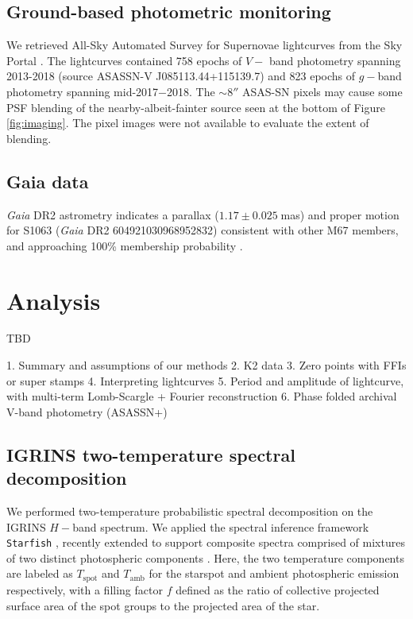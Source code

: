 \documentclass[twocolumn]{emulateapj}%
\begin{document}
\subsection{Ground-based photometric monitoring}
We retrieved All-Sky Automated Survey for Supernovae \citep[ASAS-SN;][]{shappee14} lightcurves from the Sky Portal \citep{2017PASP..129j4502K}.  The lightcurves contained 758 epochs of $V-$ band photometry spanning 2013-2018 (source ASASSN-V J085113.44+115139.7) and 823 epochs of $g-$band photometry spanning mid-2017$-$2018.  The $\sim8''$ ASAS-SN pixels may cause some PSF blending of the nearby-albeit-fainter source seen at the bottom of Figure \ref{fig:imaging}.  The pixel images were not available to evaluate the extent of blending.


\subsection{Gaia data}
\emph{Gaia} DR2 astrometry \citep{2016A&A...595A...1G, 2018A&A...616A...1G} indicates a parallax ($1.17\pm0.025 \;$mas) and proper motion for S1063 (\emph{Gaia} DR2 604921030968952832) consistent with other M67 members, and approaching 100\% membership probability \citep{2018ApJ...869....9G}.

\section{Analysis}

TBD

1. Summary and assumptions of our methods
2.  K2 data
3.  Zero points with FFIs or super stamps
4.   Interpreting lightcurves
5.  Period and amplitude of lightcurve, with multi-term Lomb-Scargle + Fourier reconstruction
6.  Phase folded archival V-band photometry (ASASSN+)


\subsection{IGRINS two-temperature spectral decomposition}

We performed two-temperature probabilistic spectral decomposition on the IGRINS $H-$band spectrum.  We applied the spectral inference framework \texttt{Starfish} \citep{czekala15}, recently extended to support composite spectra comprised of mixtures of two distinct photospheric components \citep{gullysantiago17}.  Here, the two temperature components are labeled as $T_{\mathrm{spot}}$ and $T_{\mathrm{amb}}$ for the starspot and ambient photospheric emission respectively, with a filling factor $f$ defined as the ratio of collective projected surface area of the spot groups to the projected area of the star.
\end{document}
